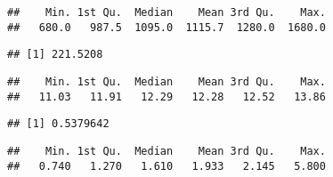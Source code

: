 \documentclass[
]{article}
\newenvironment{Shaded}{\begin{snugshade}}{\end{snugshade}}
\newcommand{\CommentTok}[1]{\textcolor[rgb]{0.56,0.35,0.01}{\textit{#1}}}
\newcommand{\DataTypeTok}[1]{\textcolor[rgb]{0.13,0.29,0.53}{#1}}
\newcommand{\KeywordTok}[1]{\textcolor[rgb]{0.13,0.29,0.53}{\textbf{#1}}}
\newcommand{\NormalTok}[1]{#1}
\newcommand{\OperatorTok}[1]{\textcolor[rgb]{0.81,0.36,0.00}{\textbf{#1}}}
\newcommand{\StringTok}[1]{\textcolor[rgb]{0.31,0.60,0.02}{#1}}
\begin{document}
\begin{verbatim}
##    Min. 1st Qu.  Median    Mean 3rd Qu.    Max. 
##   680.0   987.5  1095.0  1115.7  1280.0  1680.0
\end{verbatim}

\begin{Shaded}
\end{Shaded}

\begin{verbatim}
## [1] 221.5208
\end{verbatim}

\begin{Shaded}
\end{Shaded}

\begin{verbatim}
##    Min. 1st Qu.  Median    Mean 3rd Qu.    Max. 
##   11.03   11.91   12.29   12.28   12.52   13.86
\end{verbatim}

\begin{Shaded}
\end{Shaded}

\begin{verbatim}
## [1] 0.5379642
\end{verbatim}

\begin{Shaded}
\end{Shaded}

\begin{verbatim}
##    Min. 1st Qu.  Median    Mean 3rd Qu.    Max. 
##   0.740   1.270   1.610   1.933   2.145   5.800
\end{verbatim}

\begin{Shaded}
\end{Shaded}
\end{document}
